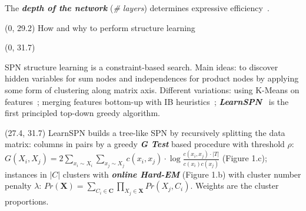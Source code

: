 \documentclass[final]{beamer}
\begin{document}
\begin{frame}{}
\begin{textblock}{25.2}
  The \emph{\textbf{depth of the network}} (\emph{\# layers})
  determines expressive efficiency~\parencite{Martens2014}.

  \end{textblock}
  
  \begin{textblock}{80}(0, 29.2)
    How and why to perform structure learning
    
  \end{textblock}
  
  \begin{textblock}{25.2}(0, 31.7)
    \footnotesize
     
    SPN structure learning is a constraint-based
    search. Main ideas: to discover hidden variables for sum nodes and independences
    for product nodes by applying some form of clustering
    along matrix axis. Different variations:
    using K-Means on
    features~\emph{\parencite{Dennis2012}}; merging features bottom-up
    with IB heuristics\emph{~\parencite{Peharz2013}};
    \emph{\textbf{LearnSPN}}~\emph{\parencite{Gens2013}} is the first principled top-down greedy
    algorithm. 
    

      

      
  \end{textblock}
  
  \begin{textblock}{25.2}(27.4, 31.7)
    \footnotesize
    LearnSPN builds a tree-like SPN by recursively splitting the data
    matrix: columns in pairs by a greedy \textbf{\emph{G Test}} based
    procedure with threshold $\rho$: $G(X_i, X_j) =  2\sum_{x_i \sim
      X_i}\sum_{x_j \sim X_j}c(x_i, x_j)\cdot \log\frac{c(x_i,
      x_j)\cdot |T|}{c(x_i)c(x_j)}$ (Figure 1.c); instances in
    $|C|$ clusters with \textbf{\emph{online Hard-EM}} (Figure 1.b) with cluster number penalty
    $\lambda$: $Pr(\mathbf{X})= \sum_{C_i \in \mathbf{C}}\prod_{X_j
      \in \mathbf{X}}Pr(X_j,C_i)$. Weights are the cluster proportions.


\end{textblock}
\end{frame}
\end{document}
